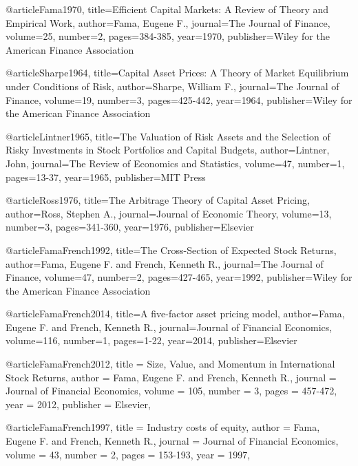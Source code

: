 \documentclass[12pt, a4paper]{article}%
\begin{document}
\begin{thebibliography}{1} %


@article{Fama1970,
    title={Efficient Capital Markets: A Review of Theory and Empirical Work},
    author={Fama, Eugene F.},
    journal={The Journal of Finance},
    volume={25},
    number={2},
    pages={384-385},
    year={1970},
    publisher={Wiley for the American Finance Association}
}

@article{Sharpe1964,
    title={Capital Asset Prices: A Theory of Market Equilibrium under Conditions of Risk},
    author={Sharpe, William F.},
    journal={The Journal of Finance},
    volume={19},
    number={3},
    pages={425-442},
    year={1964},
    publisher={Wiley for the American Finance Association}
}

@article{Lintner1965,
    title={The Valuation of Risk Assets and the Selection of Risky Investments in Stock Portfolios and Capital Budgets},
    author={Lintner, John},
    journal={The Review of Economics and Statistics},
    volume={47},
    number={1},
    pages={13-37},
    year={1965},
    publisher={MIT Press}
}

@article{Ross1976,
    title={The Arbitrage Theory of Capital Asset Pricing},
    author={Ross, Stephen A.},
    journal={Journal of Economic Theory},
    volume={13},
    number={3},
    pages={341-360},
    year={1976},
    publisher={Elsevier}
}

@article{FamaFrench1992,
    title={The Cross-Section of Expected Stock Returns},
    author={Fama, Eugene F. and French, Kenneth R.},
    journal={The Journal of Finance},
    volume={47},
    number={2},
    pages={427-465},
    year={1992},
    publisher={Wiley for the American Finance Association}
}


@article{FamaFrench2014,
    title={A five-factor asset pricing model},
    author={Fama, Eugene F. and French, Kenneth R.},
    journal={Journal of Financial Economics},
    volume={116},
    number={1},
    pages={1-22},
    year={2014},
    publisher={Elsevier}
}


@article{FamaFrench2012,
  title = {Size, Value, and Momentum in International Stock Returns},
  author = {Fama, Eugene F. and French, Kenneth R.},
  journal = {Journal of Financial Economics},
  volume = {105},
  number = {3},
  pages = {457-472},
  year = {2012},
  publisher = {Elsevier},
}


@article{FamaFrench1997,
    title = {Industry costs of equity},
    author = {Fama, Eugene F. and French, Kenneth R.},
    journal = {Journal of Financial Economics},
    volume = {43},
    number = {2},
    pages = {153-193},
    year = {1997},
}


\end{thebibliography}
\end{document}

